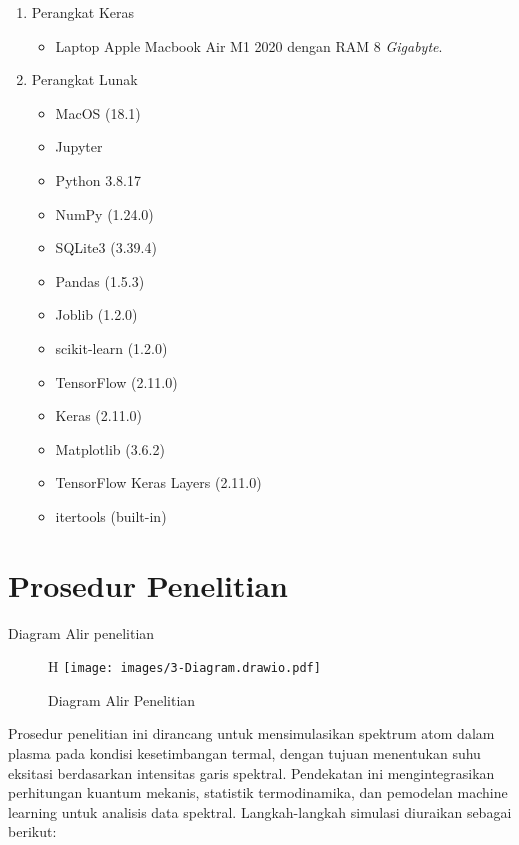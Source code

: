 \begin{enumerate}
\item Perangkat Keras
	\begin{itemize}
	\item Laptop Apple Macbook Air M1 2020 dengan RAM 8 \textit{Gigabyte}.
    \end{itemize}
\item Perangkat Lunak
	\begin{itemize}
	\item MacOS (18.1)
	\item Jupyter 
	\item Python 3.8.17
    \item NumPy (1.24.0)
    \item SQLite3 (3.39.4)
    \item Pandas (1.5.3)
    \item Joblib (1.2.0)
    \item scikit-learn (1.2.0)
    \item TensorFlow (2.11.0)
    \item Keras (2.11.0)
    \item Matplotlib (3.6.2)
    \item TensorFlow Keras Layers (2.11.0)
    \item itertools (built-in)
	\end{itemize}
\end{enumerate}

\section{Prosedur Penelitian}

\par Diagram Alir penelitian
\begin{center}
    \begin{figure}{H}
        \centering
        \texttt{[image: images/3-Diagram.drawio.pdf]} 
        \caption{Diagram Alir Penelitian}
        \label{fig:3-diagram}
    \end{figure}
\end{center}
Prosedur penelitian ini dirancang untuk mensimulasikan spektrum atom dalam plasma pada kondisi kesetimbangan termal, dengan tujuan menentukan suhu eksitasi berdasarkan intensitas garis spektral. Pendekatan ini mengintegrasikan perhitungan kuantum mekanis, statistik termodinamika, dan pemodelan machine learning untuk analisis data spektral. Langkah-langkah simulasi diuraikan sebagai berikut:

